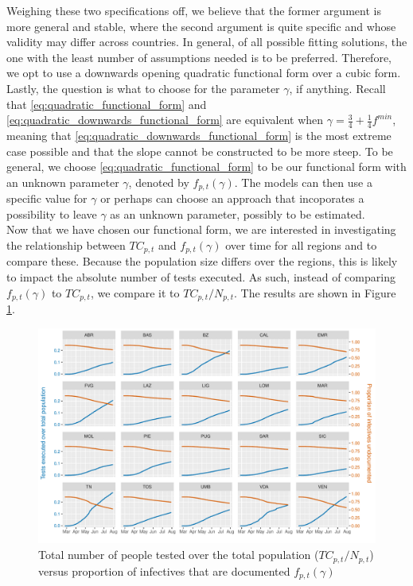 \documentclass[12pt]{article}
\begin{document}
    Weighing these two specifications off, we believe that the former argument is more general and stable, where the second argument is quite specific and whose validity may differ across countries. In general, of all possible fitting solutions, the one with the least number of assumptions needed is to be preferred. Therefore, we opt to use a downwards opening quadratic functional form over a cubic form. \\
    
    Lastly, the question is what to choose for the parameter $\gamma$, if anything. Recall that \eqref{eq:quadratic_functional_form} and \eqref{eq:quadratic_downwards_functional_form} are equivalent when $\gamma = \frac{3}{4} + \frac{1}{4}f^{min}$, meaning that \eqref{eq:quadratic_downwards_functional_form} is the most extreme case possible and that the slope cannot be constructed to be more steep. To be general, we choose \eqref{eq:quadratic_functional_form} to be our functional form with an unknown parameter $\gamma$, denoted by $f_{p,t}(\gamma)$. The models can then use a specific value for $\gamma$ or perhaps can choose an approach that incoporates a possibility to leave $\gamma$ as an unknown parameter, possibly to be estimated. \\
	
	Now that we have chosen our functional form, we are interested in investigating the relationship between $TC_{p,t}$ and $f_{p,t}(\gamma)$ over time for all regions and to compare these. Because the population size differs over the regions, this is likely to impact the absolute number of tests executed. As such, instead of comparing $f_{p,t}(\gamma)$ to $TC_{p,t}$, we compare it to $TC_{p,t} / N_{p,t}$. The results are shown in Figure \ref{fig:tamponiprop_versus_ft}. \\
	
	\begin{figure}[ht]
	    \centering
	    \includegraphics[width=\textwidth]{output/tamponiprop_vs_ft.pdf}
	    \caption{Total number of people tested over the total population ($TC_{p,t} / N_{p,t}$) versus proportion of infectives that are documented $f_{p,t}(\gamma)$}
	    \label{fig:tamponiprop_versus_ft}
	\end{figure}
	
\end{document}
